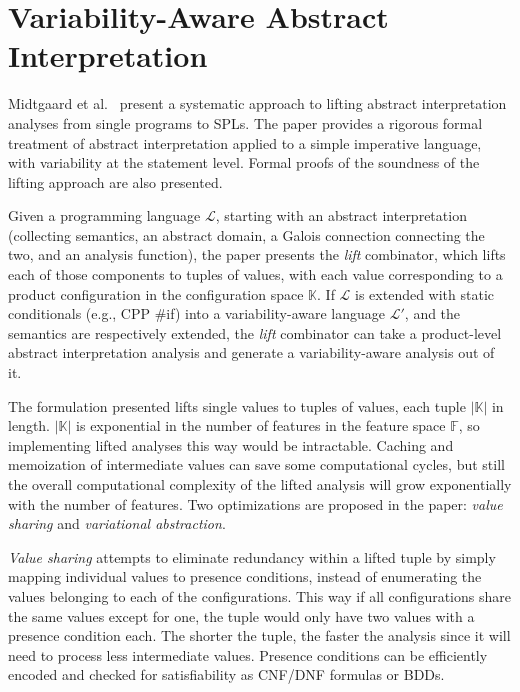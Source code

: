 \documentclass[11pt]{article}
\newcommand{\term}[1] {\emph{#1}}
\begin{document}
\section{Variability-Aware Abstract Interpretation}

\newcommand{\configSpace}{\mathbb{K}}
\newcommand{\featSpace}{\mathbb{F}}
\newcommand{\lang}{\mathcal{L}}

Midtgaard et al.~\cite{Midtgaard:2015} present a systematic approach to lifting abstract interpretation analyses from single programs to SPLs. The paper provides a rigorous formal treatment of abstract interpretation applied to a simple imperative language, with variability at the statement level. Formal proofs of the soundness of the lifting approach are also presented. 

Given a programming language $\lang$, starting with an abstract interpretation (collecting semantics, an abstract domain, a Galois connection connecting the two, and an analysis function), the paper presents the \term{lift} combinator, which lifts each of those components to tuples of values, with each value corresponding to a product configuration in the configuration space $\configSpace$. If $\lang$ is extended with static conditionals (e.g., CPP \#if) into a variability-aware language  $\lang'$, and the semantics are respectively extended, the \term{lift} combinator can take a product-level abstract interpretation analysis and generate a variability-aware analysis out of it. 

The formulation presented lifts single values to tuples of values, each tuple $|\configSpace|$ in length. $|\configSpace|$ is exponential in the number of features in the feature space $\featSpace$, so implementing lifted analyses this way would be intractable. Caching and memoization of intermediate values can save some computational cycles, but still the overall computational complexity of the lifted analysis will grow exponentially with the number of features. Two optimizations are proposed in the paper: \term{value sharing} and \term{variational abstraction}.

\term{Value sharing} attempts to eliminate redundancy within a lifted tuple by simply mapping individual values to presence conditions, instead of enumerating the values belonging to each of the configurations. This way if all configurations share the same values except for one, the tuple would only have two values with a presence condition each. The shorter the tuple, the faster the analysis since it will need to process less intermediate values. Presence conditions can be efficiently encoded and checked for satisfiability as CNF/DNF formulas or BDDs.
\end{document}

